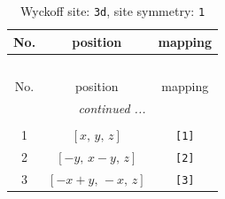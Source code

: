 \documentclass[fleqn,8pt]{jsarticle}
\begin{document}
\renewcommand{\arraystretch}{1.2}
\begin{longtable}{ccc}
\caption{Wyckoff site: {\tt 3d}, site symmetry: {\tt 1}}
 \\
 \hline \hline
No. & position & mapping \\ \hline \endfirsthead

\multicolumn{2}{l}{\tablename\ \thetable{}} \\
 \hline \hline
No. & position & mapping \\ \hline \endhead

 \hline \hline
\multicolumn{2}{r}{\footnotesize\it continued ...} \\ \endfoot

 \hline \hline
\multicolumn{2}{r}{} \\ \endlastfoot

1 & $\left[ x,\, y,\, z \right]$ & {\tt [1]} \\ \hline
2 & $\left[ - y,\, x - y,\, z \right]$ & {\tt [2]} \\ \hline
3 & $\left[ - x + y,\, - x,\, z \right]$ & {\tt [3]} \\
\end{longtable}
\end{document}
